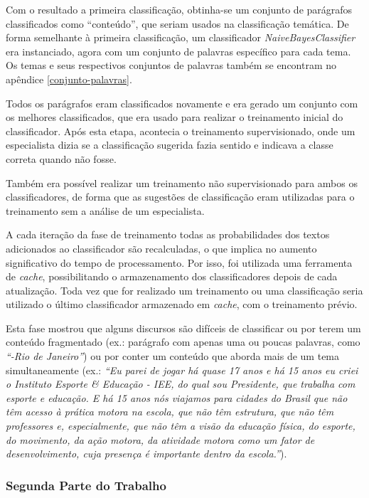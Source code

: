 Com o resultado a primeira classificação, obtinha-se um conjunto de parágrafos classificados como ``conteúdo'', que seriam usados na classificação temática. De forma semelhante à primeira classificação, um classificador \textit{NaiveBayesClassifier} era instanciado, agora com um conjunto de palavras específico para cada tema. Os temas e seus respectivos conjuntos de palavras também se encontram no apêndice \ref{conjunto-palavras}.

Todos os parágrafos eram classificados novamente e era gerado um conjunto com os melhores classificados, que era usado para realizar o treinamento inicial do classificador. Após esta etapa, acontecia o treinamento supervisionado, onde um especialista dizia se a classificação sugerida fazia sentido e indicava a classe correta quando não fosse.

Também era possível realizar um treinamento não supervisionado para ambos os classificadores, de forma que as sugestões de classificação eram utilizadas para o treinamento sem a análise de um especialista.

A cada iteração da fase de treinamento todas as probabilidades dos textos adicionados ao classificador são recalculadas, o que implica no aumento significativo do tempo de processamento. Por isso, foi utilizada uma ferramenta de \textit{cache}, possibilitando o armazenamento dos classificadores depois de cada atualização. Toda vez que for realizado um treinamento ou uma classificação seria utilizado o último classificador armazenado em \textit{cache}, com o treinamento prévio.

Esta fase mostrou que alguns discursos são difíceis de classificar ou por terem um conteúdo fragmentado (ex.: parágrafo com apenas uma ou poucas palavras, como \textit{``-Rio de Janeiro''}) ou por conter um conteúdo que aborda mais de um tema simultaneamente (ex.: \textit{``Eu parei de jogar há quase 17 anos e há 15 anos eu criei o Instituto Esporte \& Educação - IEE, do qual sou Presidente, que trabalha com esporte e educação. E há 15 anos nós viajamos para cidades do Brasil que não têm acesso à prática motora na escola, que não têm estrutura, que não têm professores e, especialmente, que não têm a visão da educação física, do esporte, do movimento, da ação motora, da atividade motora como um fator de desenvolvimento, cuja presença é importante dentro da escola.''}).

\subsubsection{Segunda Parte do Trabalho}

